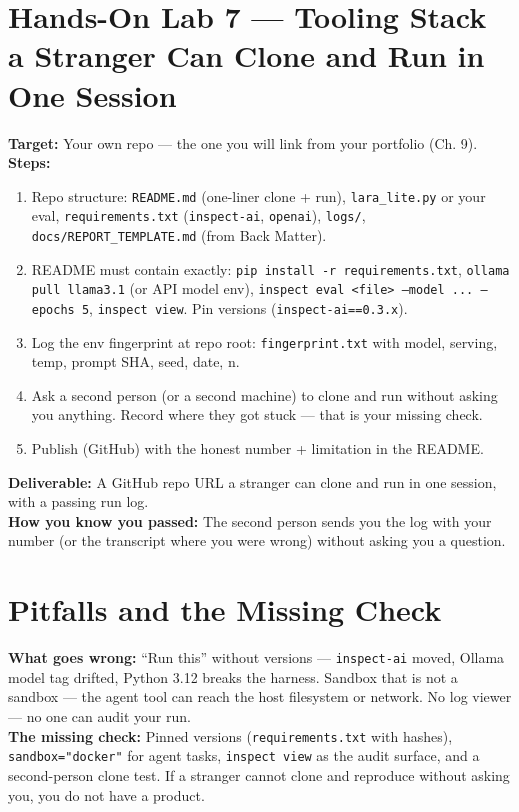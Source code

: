 \section{Hands-On Lab 7 — Tooling Stack a Stranger Can Clone and Run in One Session}
\begin{labbox}
\textbf{Target:} Your own repo — the one you will link from your portfolio (Ch. 9).\\[4pt]
\textbf{Steps:}
\begin{enumerate}
\item Repo structure: \texttt{README.md} (one-liner clone + run), \texttt{lara\_lite.py} or your eval, \texttt{requirements.txt} (\texttt{inspect-ai}, \texttt{openai}), \texttt{logs/}, \texttt{docs/REPORT\_TEMPLATE.md} (from Back Matter).
\item README must contain exactly: \texttt{pip install -r requirements.txt}, \texttt{ollama pull llama3.1} (or API model env), \texttt{inspect eval <file> --model ... --epochs 5}, \texttt{inspect view}. Pin versions (\texttt{inspect-ai==0.3.x}).
\item Log the env fingerprint at repo root: \texttt{fingerprint.txt} with model, serving, temp, prompt SHA, seed, date, n.
\item Ask a second person (or a second machine) to clone and run without asking you anything. Record where they got stuck — that is your missing check.
\item Publish (GitHub) with the honest number + limitation in the README.
\end{enumerate}
\textbf{Deliverable:} A GitHub repo URL a stranger can clone and run in one session, with a passing run log.\\[2pt]
\textbf{How you know you passed:} The second person sends you the log with your number (or the transcript where you were wrong) without asking you a question.
\end{labbox}

\section{Pitfalls and the Missing Check}
\begin{pitfallbox}
\textbf{What goes wrong:} ``Run this'' without versions — \texttt{inspect-ai} moved, Ollama model tag drifted, Python 3.12 breaks the harness. Sandbox that is not a sandbox — the agent tool can reach the host filesystem or network. No log viewer — no one can audit your run.\\[4pt]
\textbf{The missing check:} Pinned versions (\texttt{requirements.txt} with hashes), \texttt{sandbox="docker"} for agent tasks, \texttt{inspect view} as the audit surface, and a second-person clone test. If a stranger cannot clone and reproduce without asking you, you do not have a product.
\end{pitfallbox}

